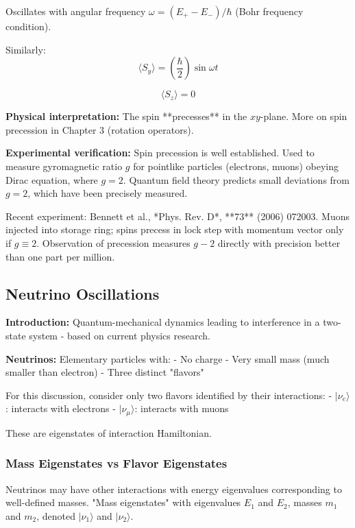 \documentclass[11pt,a4paper]{article}
\begin{document}
Oscillates with angular frequency $\omega = (E_+ - E_-)/\hbar$ (Bohr frequency condition).

Similarly:
\begin{equation}
\langle S_y \rangle = \left(\frac{\hbar}{2}\right)\sin\omega t
\tag{2.62a}
\end{equation}

\begin{equation}
\langle S_z \rangle = 0
\tag{2.62b}
\end{equation}

\textbf{Physical interpretation:} The spin **precesses** in the $xy$-plane. More on spin precession in Chapter 3 (rotation operators).

\textbf{Experimental verification:} Spin precession is well established. Used to measure gyromagnetic ratio $g$ for pointlike particles (electrons, muons) obeying Dirac equation, where $g = 2$. Quantum field theory predicts small deviations from $g = 2$, which have been precisely measured.

Recent experiment: Bennett et al., *Phys. Rev. D*, **73** (2006) 072003. Muons injected into storage ring; spins precess in lock step with momentum vector only if $g \equiv 2$. Observation of precession measures $g - 2$ directly with precision better than one part per million.

\subsection{Neutrino Oscillations}

\textbf{Introduction:} Quantum-mechanical dynamics leading to interference in a two-state system - based on current physics research.

\textbf{Neutrinos:} Elementary particles with:
- No charge
- Very small mass (much smaller than electron)
- Three distinct "flavors"

For this discussion, consider only two flavors identified by their interactions:
- $|\nu_e\rangle$: interacts with electrons
- $|\nu_\mu\rangle$: interacts with muons

These are eigenstates of interaction Hamiltonian.

\subsubsection{Mass Eigenstates vs Flavor Eigenstates}

Neutrinos may have other interactions with energy eigenvalues corresponding to well-defined masses. "Mass eigenstates" with eigenvalues $E_1$ and $E_2$, masses $m_1$ and $m_2$, denoted $|\nu_1\rangle$ and $|\nu_2\rangle$.
\end{document}
